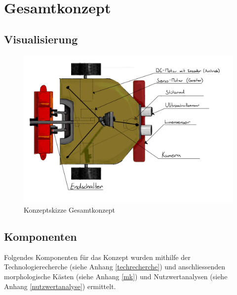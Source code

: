 \section{Gesamtkonzept}

\subsection{Visualisierung}

\begin{figure}[H]
\centering
\includegraphics[width=\textwidth]{assets/gesamtkonzept/Skizze-Fahrzeugkonzept-Beschriftet.jpg}
\caption{Konzeptskizze Gesamtkonzept}
\label{fig:robot_concept-scetch_labeld}
\end{figure}


\subsection{Komponenten}

Folgendes Komponenten für das Konzept wurden mithilfe der Technologierecherche (siehe Anhang \ref{techrecherche}) und anschliessenden morphologische Kästen (siehe Anhang \ref{mk}) und Nutzwertanalysen (siehe Anhang \ref{nutzwertanalyse}) ermittelt. 

